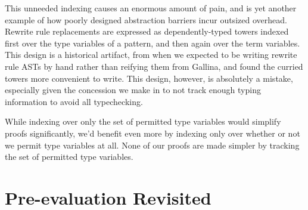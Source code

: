 This unneeded indexing causes an enormous amount of pain, and is yet another example of how poorly designed abstraction barriers incur outsized overhead.
Rewrite rule replacements are expressed as dependently-typed towers indexed first over the type variables of a pattern, and then again over the term variables.
This design is a historical artifact, from when we expected to be writing rewrite rule ASTs by hand rather than reifying them from Gallina, and found the curried towers more convenient to write.
This design, however, is absolutely a mistake, especially given the concession we make in  to not track enough typing information to avoid all typechecking.

While indexing over only the set of permitted type variables would simplify proofs significantly, we'd benefit even more by indexing only over whether or not we permit type variables at all.
None of our proofs are made simpler by tracking the set of permitted type variables.
%
%
%

\section{Pre-evaluation Revisited}\label{sec:rewriting-more:pre-reduction-again}

